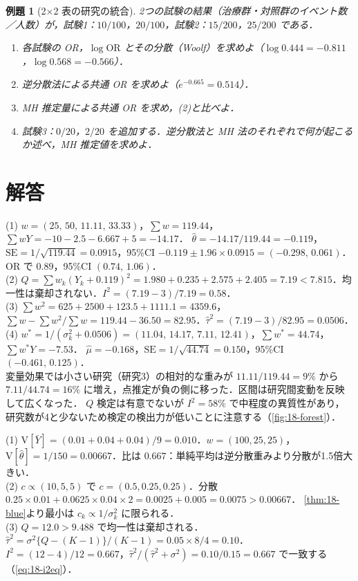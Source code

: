 \documentclass[a4paper,11pt,openany]{ltjsbook}
\newtheorem{reidai}{例題}[chapter]
\newenvironment{kaitou}[1]{%
  \par\medskip\noindent
  \begin{tcolorbox}[enhanced,breakable,colback=bkgray!3,colframe=bkgray!60,boxrule=0.4pt,
    left=4pt,right=4pt,top=2pt,bottom=2pt,arc=1pt,
    title={\cref{#1}の解答},fonttitle=\bfseries\small,coltitle=white,colbacktitle=bkgray!80]}%
  {\end{tcolorbox}\par}
\newcommand{\V}{\mathrm{V}}
\newcommand{\SE}{\mathrm{SE}}
\newcommand{\OR}{\mathrm{OR}}
\begin{document}
\begin{reidai}[2×2 表の研究の統合]\label{reidai:18-3}
2つの試験の結果（治療群・対照群のイベント数／人数）が，試験1：$10/100$，$20/100$，試験2：$15/200$，$25/200$ である．
\begin{enumerate}[label=(\arabic*)]
\item 各試験の OR，$\log\OR$ とその分散（Woolf）を求めよ（$\log0.444=-0.811$，$\log0.568=-0.566$）．
\item 逆分散法による共通 OR を求めよ（$e^{-0.665}=0.514$）．
\item MH 推定量による共通 OR を求め，(2)と比べよ．
\item 試験3：$0/20$，$2/20$ を追加する．逆分散法と MH 法のそれぞれで何が起こるか述べ，MH 推定値を求めよ．
\end{enumerate}
\end{reidai}

\section{解答}\label{sec:18-sol}
\begin{kaitou}{reidai:18-1}
(1) $w=(25,\,50,\,11.11,\,33.33)$，$\sum w=119.44$，$\sum wY=-10-2.5-6.667+5=-14.17$．
$\hat\theta=-14.17/119.44=-0.119$，$\SE=1/\sqrt{119.44}=0.0915$，95\%CI $-0.119\pm1.96\times0.0915=(-0.298,\,0.061)$．OR で $0.89$，95\%CI $(0.74,\,1.06)$．\\
(2) $Q=\sum w_k(Y_k+0.119)^2=1.980+0.235+2.575+2.405=7.19<7.815$．均一性は棄却されない．$I^2=(7.19-3)/7.19=0.58$．\\
(3) $\sum w^2=625+2500+123.5+1111.1=4359.6$，$\sum w-\sum w^2/\sum w=119.44-36.50=82.95$．$\hat\tau^2=(7.19-3)/82.95=0.0506$．\\
(4) $w^*=1/(\sigma_k^2+0.0506)=(11.04,\,14.17,\,7.11,\,12.41)$，$\sum w^*=44.74$，$\sum w^*Y=-7.53$．
$\hat\mu=-0.168$，$\SE=1/\sqrt{44.74}=0.150$，95\%CI $(-0.461,\,0.125)$．\\
変量効果では小さい研究（研究3）の相対的な重みが $11.11/119.44=9\%$ から $7.11/44.74=16\%$ に増え，点推定が負の側に移った．区間は研究間変動を反映して広くなった．
$Q$ 検定は有意でないが $I^2=58\%$ で中程度の異質性があり，研究数が4と少ないため検定の検出力が低いことに注意する（\cref{fig:18-forest}）．
\end{kaitou}

\begin{kaitou}{reidai:18-2}
(1) $\V[\bar Y]=(0.01+0.04+0.04)/9=0.010$．$w=(100,25,25)$，$\V[\hat\theta]=1/150=0.00667$．比は $0.667$：単純平均は逆分散重みより分散が1.5倍大きい．\\
(2) $c\propto(10,5,5)$ で $c=(0.5,0.25,0.25)$．分散 $0.25\times0.01+0.0625\times0.04\times2=0.0025+0.005=0.0075>0.00667$．
\cref{thm:18-blue}より最小は $c_k\propto1/\sigma_k^2$ に限られる．\\
(3) $Q=12.0>9.488$ で均一性は棄却される．$\hat\tau^2=\sigma^2\{Q-(K-1)\}/(K-1)=0.05\times8/4=0.10$．
$I^2=(12-4)/12=0.667$，$\hat\tau^2/(\hat\tau^2+\sigma^2)=0.10/0.15=0.667$ で一致する（\cref{eq:18-i2eq}）．
\end{kaitou}
\end{document}
